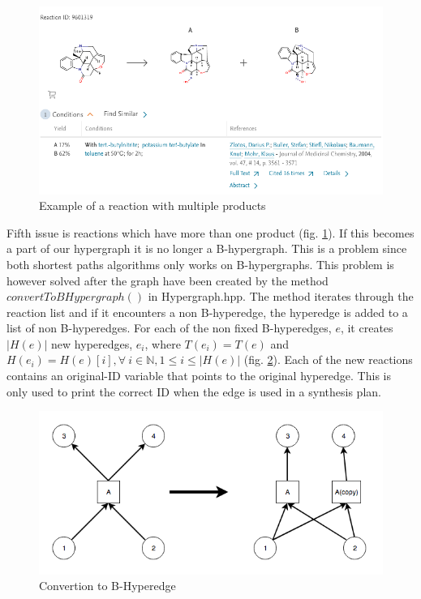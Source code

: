 \documentclass[a4paper,10pt,titlepage]{paper}
\begin{document}
\begin{figure}[H]
\hspace{-1cm}
\includegraphics[scale=0.5]{Billeder/MultipleProducts.png}
\caption{Example of a reaction with multiple products}
\label{fig::MultipleProducts}
\end{figure}
\label{ConvertToB-Hypergraph}
Fifth issue is reactions which have more than one product (fig. \ref{fig::MultipleProducts}). If this becomes a part of our hypergraph it is no longer a B-hypergraph. This is a problem since both shortest paths algorithms only works on B-hypergraphs. This problem is however solved after the graph have been created by the method $convertToBHypergraph()$ in Hypergraph.hpp. The method iterates through the reaction list and if it encounters a non B-hyperedge, the hyperedge is added to a list of non B-hyperedges. For each of the non fixed B-hyperedges, $e$, it creates $|H(e)|$ new hyperedges, $e_i$, where $T(e_i)=T(e)$ and $H(e_i) = H(e)[i], \forall\ i \in \mathbb{N}, 1 \leq i\leq|H(e)|$  (fig. \ref{fig::CopyReaction}). Each of the new reactions contains an original-ID variable that points to the original hyperedge. This is only used to print the correct ID when the edge is used in a synthesis plan.

\begin{figure}[H]
\includegraphics[scale=0.5]{Billeder/CopyReaction.png}
\caption{Convertion to B-Hyperedge}
\label{fig::CopyReaction}
\end{figure}
\end{document}
